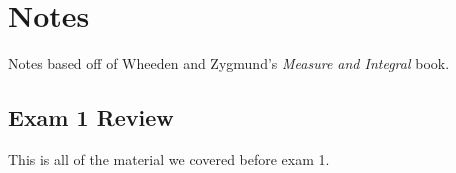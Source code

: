 \chapter{Notes}
Notes based off of Wheeden and Zygmund's \emph{Measure and Integral} book.
\section{Exam 1 Review}
This is all of the material we covered before exam 1.

\bigskip

